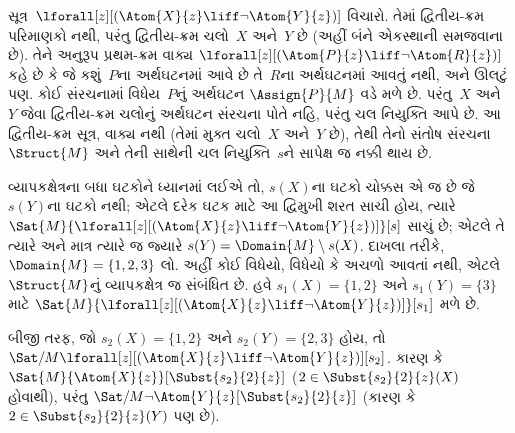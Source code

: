 \begin{ex}
  સૂત્ર~$\lforall[z][(\Atom{X}{z} \liff \lnot
    \Atom{Y}{z})]$ વિચારો. તેમાં દ્વિતીય-ક્રમ પરિમાણકો નથી, પરંતુ
  દ્વિતીય-ક્રમ ચલો~$X$ અને~$Y$ છે (અહીં બંને એકસ્થાની
  સમજવાના છે). તેને અનુરૂપ પ્રથમ-ક્રમ વાક્ય
  $\lforall[z][(\Atom{P}{z} \liff \lnot \Atom{R}{z})]$ કહે છે કે
  જે કશું~$P$ના અર્થઘટનમાં આવે છે તે~$R$ના અર્થઘટનમાં આવતું નથી,
  અને ઊલટું પણ. કોઈ સંરચનામાં વિધેય~$P$નું અર્થઘટન
  $\Assign{P}{M}$ વડે મળે છે. પરંતુ~$X$ અને~$Y$ જેવા દ્વિતીય-ક્રમ
  ચલોનું અર્થઘટન સંરચના પોતે નહિ, પરંતુ
  ચલ નિયુક્તિ આપે છે. આ દ્વિતીય-ક્રમ સૂત્ર,
  વાક્ય નથી (તેમાં મુક્ત ચલો~$X$ અને~$Y$ છે), તેથી
  તેનો સંતોષ સંરચના~$\Struct{M}$ અને તેની સાથેની
  ચલ નિયુક્તિ~$s$ને સાપેક્ષ જ નક્કી થાય છે.

  વ્યાપકક્ષેત્રના બધા ઘટકોને ધ્યાનમાં લઈએ તો, $s(X)$ના ઘટકો
  ચોક્કસ એ જ છે જે $s(Y)$ના ઘટકો નથી; એટલે દરેક ઘટક માટે આ
  દ્વિમુખી શરત સાચી હોય,
  ત્યારે $\Sat{M}{\lforall[z][(\Atom{X}{z} \liff \lnot
  \Atom{Y}{z})]}[s]$ સાચું છે; એટલે તે ત્યારે અને માત્ર ત્યારે જ
  જ્યારે $s(Y) = \Domain{M} \setminus s(X)$.
  દાખલા તરીકે,
  $\Domain{M} = \{1, 2, 3\}$ લો. અહીં કોઈ વિધેયો,
  વિધેયો કે અચળો આવતાં નથી, એટલે
  $\Struct{M}$નું વ્યાપકક્ષેત્ર જ સંબંધિત છે. હવે
  $s_1(X) = \{1, 2\}$ અને $s_1(Y) = \{3\}$ માટે
  $\Sat{M}{\lforall[z][(\Atom{X}{z}
      \liff \lnot \Atom{Y}{z})]}[s_1]$ મળે છે.

  બીજી તરફ, જો $s_2(X) = \{1, 2\}$ અને $s_2(Y) = \{2, 3\}$ હોય,
  તો $\Sat/{M}{\lforall[z][(\Atom{X}{z} \liff \lnot
      \Atom{Y}{z})]}[s_2]$. કારણ કે
  $\Sat{M}{\Atom{X}{z}}[\Subst{s_2}{2}{z}]$ ($2 \in \Subst{s_2}{2}{z}(X)$ હોવાથી),
  પરંતુ $\Sat/{M}{\lnot \Atom{Y}{z}}[\Subst{s_2}{2}{z}]$
  (કારણ કે $2 \in \Subst{s_2}{2}{z}(Y)$ પણ છે).
\end{ex}

